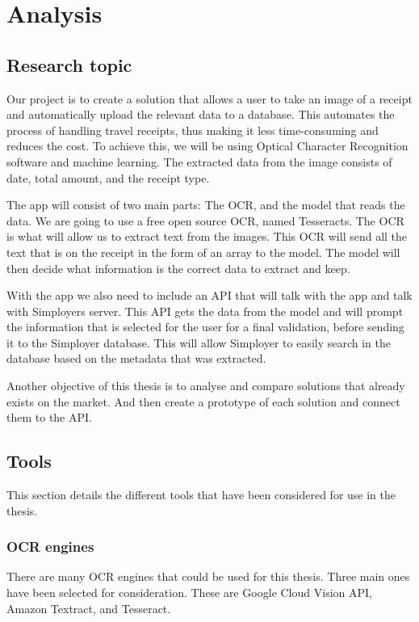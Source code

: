 \cleardoublepage
\chapter{Analysis}
\label{ch:analysis}

\section{Research topic}\label{sec:research-topic}

Our project is to create a solution that allows a user to take an image of a receipt and automatically upload the relevant data to a database.
This automates the process of handling travel receipts, thus making it less time-consuming and reduces the cost.
To achieve this, we will be using Optical Character Recognition software and machine learning\@.
The extracted data from the image consists of date, total amount, and the receipt type.

The app will consist of two main parts: The OCR, and the model that reads the data.
We are going to use a free open source OCR, named Tesseracts.
The OCR is what will allow us to extract text from the images.
This OCR will send all the text that is on the receipt in the form of an array to the model.
The model will then decide what information is the correct data to extract and keep.

With the app we also need to include an API that will talk with the app and talk with Simployers server.
This API gets the data from the model and will prompt the information that is selected for the user for a final
validation, before sending it to the Simployer database.
This will allow Simployer to easily search in the database based on the metadata that was extracted.

Another objective of this thesis is to analyse and compare solutions that already exists on the market.
And then create a prototype of each solution and connect them to the API\@.

\section{Tools}\label{sec:tools}
This section details the different tools that have been considered for use in the thesis.
\subsection{OCR engines}\label{subsec:ocr-engines}
There are many OCR engines that could be used for this thesis.
Three main ones have been selected for consideration.
These are Google Cloud Vision API, Amazon Textract, and Tesseract.
